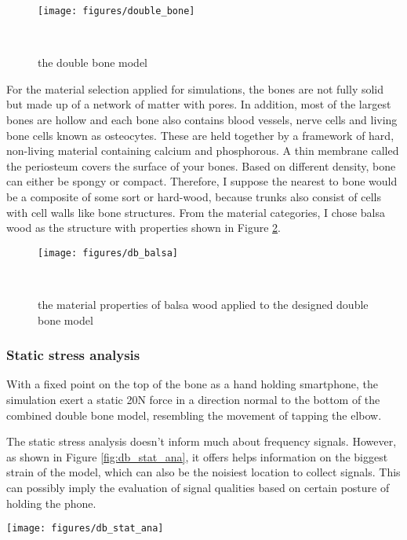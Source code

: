 \documentclass{sigchi}
\begin{document}
\begin{figure}
\centering
  \texttt{[image: figures/double\_bone]}
  \caption{the double bone model}~\label{fig:double_bone}
\end{figure}


For the material selection applied for simulations, the bones are not fully solid but made up of a network of matter with pores. In addition, most of the largest bones are hollow and each bone also contains blood vessels, nerve cells and living bone cells known as osteocytes. These are held together by a framework of hard, non-living material containing calcium and phosphorous. A thin membrane called the periosteum covers the surface of your bones. Based on different density, bone can either be spongy or compact. Therefore, I suppose the nearest to bone would be a composite of some sort or hard-wood, because trunks also consist of cells with cell walls like bone structures. From the material categories, I chose balsa wood as the structure with properties shown in Figure \ref{fig:db_balsa}.

\begin{figure}
\centering
  \texttt{[image: figures/db\_balsa]}
  \caption{the material properties of balsa wood applied to the designed double bone model}~\label{fig:db_balsa}
\end{figure}

\subsubsection{Static stress analysis}

With a fixed point on the top of the bone as a hand holding smartphone, the simulation exert a static 20N force in a direction normal to the bottom of the combined double bone model, resembling the movement of tapping the elbow.

The static stress analysis doesn't inform much about frequency signals. However, as shown in Figure \ref{fig:db_stat_ana}, it offers helps information on the biggest strain of the model, which can also be the noisiest location to collect signals. This can possibly imply the evaluation of signal qualities based on certain posture of holding the phone.


\begin{figure*}
\centering
  \texttt{[image: figures/db\_stat\_ana]}
  \caption{the static stress analysis of the double bone model in (a) stress, (b) displacement and (c) strain.}~\label{fig:db_stat_ana}
\end{figure*}
\end{document}
